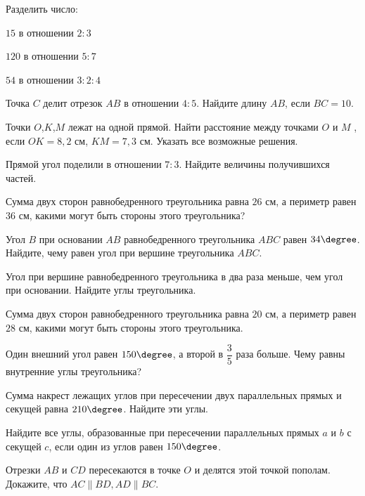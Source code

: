 \begin{class}[number=2]
	\begin{listofex}
		\item Разделить число:
		\begin{enumcols}[itemcolumns=3]
			\item \( 15 \) в отношении \( 2:3 \)
			\item \( 120 \) в отношении \( 5:7 \)
			\item \( 54 \) в отношении \( 3:2:4 \)
		\end{enumcols}
		\item Точка \( C \) делит отрезок \( AB \) в отношении \( 4:5 \). Найдите длину \( AB \), если \( BC=10 \).
		\item Точки \( O \),\( K \),\( M \) лежат на одной прямой. Найти расстояние между
		точками \( O \) и \( M \) , если \( OK = 8,2 \) см, \( KM = 7,3 \) см. Указать все
		возможные решения.
		\item Прямой угол поделили в отношении \( 7:3 \). Найдите величины получившихся частей.
		\item Сумма двух сторон равнобедренного треугольника равна \( 26 \) см, а
		периметр равен \( 36 \) см, какими могут быть стороны этого
		треугольника?
		\item Угол \( B \) при основании \( AB \) равнобедренного треугольника \( ABC \) равен \( 34\degree \). Найдите, чему равен угол при вершине треугольника \( ABC \).
		\item Угол при вершине равнобедренного треугольника в два раза меньше, чем угол при основании. Найдите углы треугольника.
		\item Сумма двух сторон равнобедренного треугольника равна \( 20 \) см, а периметр равен \( 28 \) см, какими могут быть стороны этого треугольника.
		\item Один внешний угол равен \( 150\degree \), а второй в \( \dfrac{ 3 }{ 5 } \) раза больше. Чему равны внутренние углы треугольника?
		\item Сумма накрест лежащих углов при пересечении двух параллельных прямых и секущей равна \(210 \degree \). Найдите эти углы.
		\item Найдите все углы, образованные при пересечении параллельных прямых \(a\) и \(b\) с секущей \(c\), если один из углов равен \( 150 \degree \).
		\item Отрезки \(AB\) и \(CD\) пересекаются в точке \(O\) и делятся этой точкой пополам. Докажите, что \(AC \parallel BD, AD \parallel BC\).
	\end{listofex}
\end{class}

